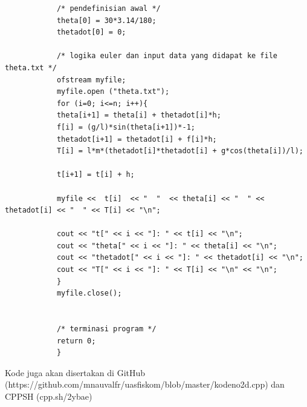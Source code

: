 \documentclass[12pt]{article}
\begin{document}
\begin{enumerate}[label=(\alph*)]
\begin{verbatim}
			/* pendefinisian awal */
			theta[0] = 30*3.14/180;
			thetadot[0] = 0;
			
			/* logika euler dan input data yang didapat ke file theta.txt */
			ofstream myfile;
			myfile.open ("theta.txt");
			for (i=0; i<=n; i++){
			theta[i+1] = theta[i] + thetadot[i]*h;
			f[i] = (g/l)*sin(theta[i+1])*-1;
			thetadot[i+1] = thetadot[i] + f[i]*h;
			T[i] = l*m*(thetadot[i]*thetadot[i] + g*cos(theta[i])/l);
			
			t[i+1] = t[i] + h;
			
			myfile <<  t[i]  << "  "  << theta[i] << "  " << thetadot[i] << "  " << T[i] << "\n";
			
			cout << "t[" << i << "]: " << t[i] << "\n";
			cout << "theta[" << i << "]: " << theta[i] << "\n";
			cout << "thetadot[" << i << "]: " << thetadot[i] << "\n";
			cout << "T[" << i << "]: " << T[i] << "\n" << "\n";
			}
			myfile.close();
			
			
			/* terminasi program */
			return 0;
			}
			\end{verbatim}
			Kode juga akan disertakan di GitHub \\ (https://github.com/mnauvalfr/uasfiskom/blob/master/kodeno2d.cpp) dan CPPSH (cpp.sh/2ybae)
		\end{enumerate}
\end{document}
